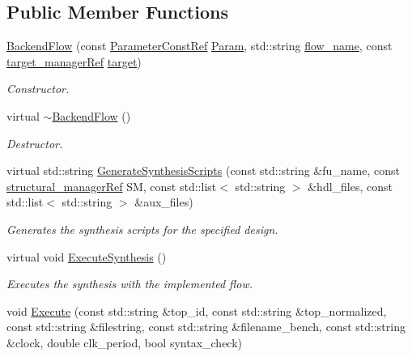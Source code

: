 \subsection*{Public Member Functions}
\begin{DoxyCompactItemize}
\item 
\hyperlink{classBackendFlow_a97358ef6c622ed1f7ffc439e6f3372af}{Backend\+Flow} (const \hyperlink{Parameter_8hpp_a37841774a6fcb479b597fdf8955eb4ea}{Parameter\+Const\+Ref} \hyperlink{classBackendFlow_a7d21e7cf0afc64b13e0009c9e351873d}{Param}, std\+::string \hyperlink{classBackendFlow_acb230ccab7e32cf0a88811097ff8c3f8}{flow\+\_\+name}, const \hyperlink{target__manager_8hpp_aee0b586a84fb6eb4faefa6e41e1735a9}{target\+\_\+manager\+Ref} \hyperlink{classBackendFlow_a693ab6eaf29b1836eb91dcd92eb0189f}{target})
\begin{DoxyCompactList}\small\item\em Constructor. \end{DoxyCompactList}\item 
virtual \hyperlink{classBackendFlow_ae37237c3e94c8505422c9c668c97dce5}{$\sim$\+Backend\+Flow} ()
\begin{DoxyCompactList}\small\item\em Destructor. \end{DoxyCompactList}\item 
virtual std\+::string \hyperlink{classBackendFlow_a384ea03eb37c09770d9d72c013793f54}{Generate\+Synthesis\+Scripts} (const std\+::string \&fu\+\_\+name, const \hyperlink{structural__manager_8hpp_ab3136f0e785d8535f8d252a7b53db5b5}{structural\+\_\+manager\+Ref} SM, const std\+::list$<$ std\+::string $>$ \&hdl\+\_\+files, const std\+::list$<$ std\+::string $>$ \&aux\+\_\+files)
\begin{DoxyCompactList}\small\item\em Generates the synthesis scripts for the specified design. \end{DoxyCompactList}\item 
virtual void \hyperlink{classBackendFlow_af0e8f1973185540298eaa3ac4bee3b2c}{Execute\+Synthesis} ()
\begin{DoxyCompactList}\small\item\em Executes the synthesis with the implemented flow. \end{DoxyCompactList}\item 
void \hyperlink{classBackendFlow_a96bbfb3f9fd7cf6dbd162f692ac81f9f}{Execute} (const std\+::string \&top\+\_\+id, const std\+::string \&top\+\_\+normalized, const std\+::string \&filestring, const std\+::string \&filename\+\_\+bench, const std\+::string \&clock, double clk\+\_\+period, bool syntax\+\_\+check)

\end{DoxyCompactItemize}
